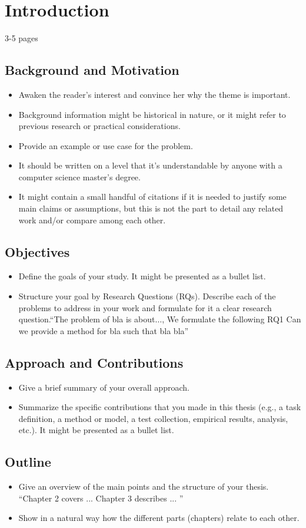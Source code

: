 
\chapter{Introduction}
\label{ch:intro}

3-5 pages

\section{Background and Motivation}
\label{sec:background}
\begin{itemize}
    \item Awaken the reader's interest and convince her why the theme is important.
    \item Background information might be historical in nature, or it might refer to previous research or practical considerations.
    \item Provide an example or use case for the problem.
    \item It should be written on a level that it's understandable by anyone with a computer science master's degree.
    \item It might contain a small handful of citations if it is needed to justify some main claims or assumptions, but this is not the part to detail any related work and/or compare among each other.
\end{itemize}

\section{Objectives}
\label{sec:objectives}
\begin{itemize}
   \item Define the goals of your study. It might be presented as a bullet list.
  \item Structure your goal by Research Questions (RQs). Describe each of the problems to address in your work and formulate for it a clear research question.``The problem of bla is about$\dots$, We formulate the following RQ1 Can we provide a method for bla such that bla bla''
\end{itemize}


\section{Approach and Contributions}
\label{sec:approach}

\begin{itemize}
  \item Give a brief summary of your overall approach.
  \item Summarize the specific contributions that you made in this thesis (e.g., a task definition, a method or model, a test collection, empirical results, analysis, etc.). It might be presented as a bullet list.
\end{itemize}

\section{Outline}
\begin{itemize}
    \item Give an overview of the main points and the structure of your thesis. ``Chapter 2 covers ... Chapter 3 describes ... ''
    \item Show in a natural way how the different parts (chapters) relate to each other.
\end{itemize}